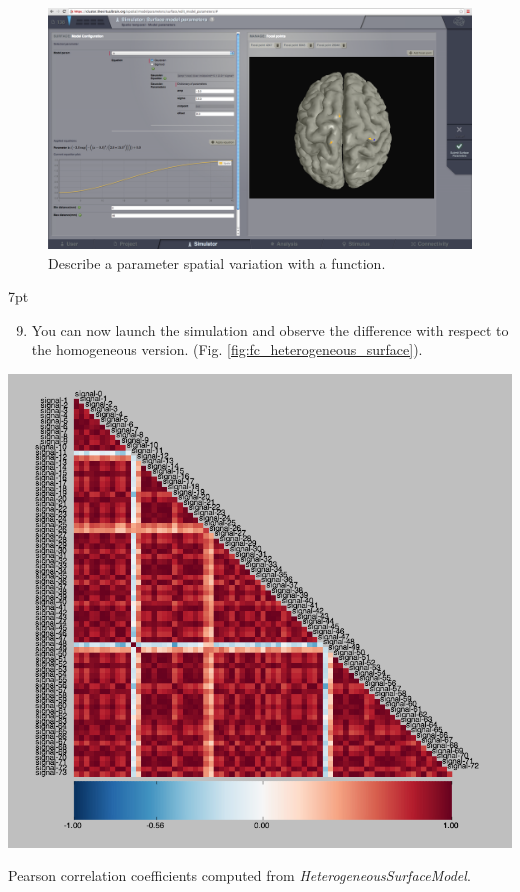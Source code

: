 \documentclass{tufte-handout}
\newenvironment{simulation}{%
  \def\FrameCommand{%
    \hspace{1pt}%
    {\color{ForestGreen}\vrule width 2pt}%
    {\color{simulationshade}\vrule width 4pt}%
    \colorbox{simulationshade}%
  }%
  \MakeFramed{\advance\hsize-\width\FrameRestore}%
  \noindent\hspace{-4.55pt}%
  \begin{adjustwidth}{}{7pt}%
  \vspace{2pt}\vspace{2pt}%
}
{%
  \vspace{2pt}\end{adjustwidth}\endMakeFramed%
}
\begin{document}
\begin{figure}[h]
  \includegraphics[width=\linewidth]{Handout_UI_HeterogenousModelAndStimulation_SurfaceSpatialization.png}%
  \caption{Describe a parameter spatial variation with a function.}%
  \label{fig:surface_spatialization}%
\end{figure}

\begin{simulation}
\begin{enumerate}[resume]
\setcounter{enumi}{8}
\item You can now launch the simulation and observe the difference with respect to the homogeneous version. (Fig. \ref{fig:fc_heterogeneous_surface}).
\end{enumerate}
\end{simulation}

\begin{marginfigure}
  \includegraphics[width=\linewidth]{Handout_UI_HeterogenousModelAndStimulation_PearsonHeterogeneousSurface.png}%
  \caption{Pearson correlation coefficients computed from \textit{HeterogeneousSurfaceModel}.}%
  \label{fig:fc_heterogeneous_surface}%
\end{marginfigure}
\end{document}
